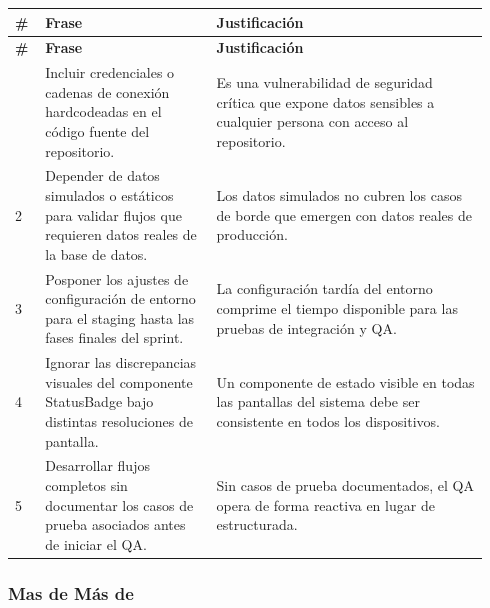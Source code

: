 \documentclass[11pt,a4paper]{article}
\begin{document}
\begingroup
\scriptsize
\setlength{\tabcolsep}{3pt}
\begin{longtable}{P{0.06\linewidth}P{0.34\linewidth}P{0.54\linewidth}}
\toprule
\textbf{\#} & \textbf{Frase} & \textbf{Justificación} \\
\midrule
\endfirsthead
\toprule
\textbf{\#} & \textbf{Frase} & \textbf{Justificación} \\
\midrule
\endhead
\bottomrule
{} & Incluir credenciales o cadenas de conexión hardcodeadas en el código fuente del repositorio. & Es una vulnerabilidad de seguridad crítica que expone datos sensibles a cualquier persona con acceso al repositorio. \\
2 & Depender de datos simulados o estáticos para validar flujos que requieren datos reales de la base de datos. & Los datos simulados no cubren los casos de borde que emergen con datos reales de producción. \\
3 & Posponer los ajustes de configuración de entorno para el staging hasta las fases finales del sprint. & La configuración tardía del entorno comprime el tiempo disponible para las pruebas de integración y QA. \\
4 & Ignorar las discrepancias visuales del componente StatusBadge bajo distintas resoluciones de pantalla. & Un componente de estado visible en todas las pantallas del sistema debe ser consistente en todos los dispositivos. \\
5 & Desarrollar flujos completos sin documentar los casos de prueba asociados antes de iniciar el QA. & Sin casos de prueba documentados, el QA opera de forma reactiva en lugar de estructurada. \\
\end{longtable}
\endgroup

\subsubsection{Mas de Más de}
\end{document}
